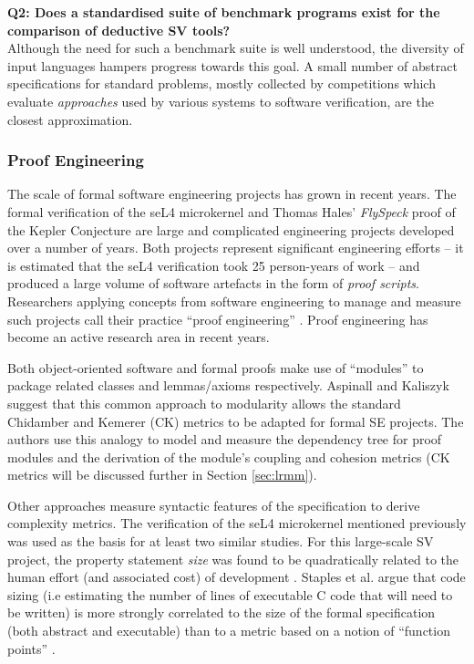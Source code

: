 \textbf{Q2: Does a standardised suite of benchmark programs exist for the comparison of deductive SV tools?} \\
Although the need for such a benchmark suite is well understood, the diversity of input languages hampers progress towards this goal. 
A small number of abstract specifications for standard problems, mostly collected by competitions which evaluate \textit{approaches} used by various systems to software verification, are the closest approximation.  

\subsubsection{Proof Engineering}
\label{sub:lrsvmmpe}

The scale of formal software engineering projects has grown in recent years. The formal verification of the seL4 microkernel \cite{Klein:2014:CFV} and Thomas Hales' \textit{FlySpeck} proof of the Kepler Conjecture \cite{hales-kepler} are large and complicated engineering projects developed over a number of years. Both projects represent significant engineering efforts -- it is estimated that the seL4 verification took 25 person-years of work -- and produced a large volume of software artefacts in the form of \textit{proof scripts}. Researchers applying concepts from software engineering to manage and measure such projects call their practice ``proof engineering'' \cite{Klein2014}. Proof engineering has become an active research area in recent years. 

Both object-oriented software and formal proofs make use of ``modules'' to package related classes and lemmas/axioms respectively. Aspinall and Kaliszyk \cite{Aspinall2016} suggest that this common approach to modularity allows the standard Chidamber and Kemerer \cite{CandK} (CK) metrics to be adapted for formal SE projects. The authors use this analogy to model and measure the dependency tree for proof modules and the derivation of the module's coupling and cohesion metrics (CK metrics will be discussed further in Section \ref{sec:lrmm}).

Other approaches measure syntactic features of the specification to derive complexity metrics. The verification of the seL4 microkernel mentioned previously was used as the basis for at least two similar studies. For this large-scale SV project, the property statement \textit{size} was found to be quadratically related to the human effort (and associated cost) of development \cite{CostIndicator}. Staples et al. argue that code sizing (i.e estimating the number of lines of executable C code that will need to be written) is more strongly correlated to the size of the formal specification (both abstract and executable) than to a metric based on a notion of ``function points'' \cite{Staples:2013}.
   
